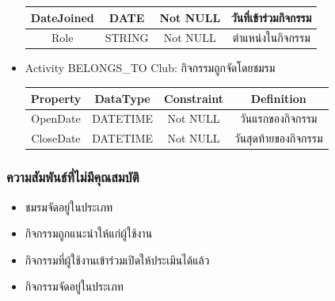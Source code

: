 \documentclass[14pt,oneside,openright,a4paper]{cpe-thai-project}
\begin{document}
\begin{itemize}
\begin{center}
\begin{tabular}{|c|c|c|c|}
          DateJoined & DATE     & Not NULL    & วันที่เข้าร่วมกิจกรรม \\ \hline
          Role       & STRING   & Not NULL    & ตำแหน่งในกิจกรรม \\ \hline
          \end{tabular}
          \label{tab:ActivityRelationship}
        \end{center}
      \item Activity BELONGS\_TO Club: กิจกรรมถูกจัดโดยชมรม
        \begin{center}
          \begin{tabular}{|c|c|c|c|}
          \hline
          \rowcolor[HTML]{9FC5E8} 
          Property   & DataType & Constraint & Definition \\ \hline
          OpenDate   & DATETIME & Not NULL    & วันแรกของกิจกรรม \\ \hline
          CloseDate  & DATETIME & Not NULL    & วันสุดท้ายของกิจกรรม \\ \hline
          \end{tabular}
          \label{tab:ClubActivityRelationship}
        \end{center}
    \end{itemize}    
      \subsubsection{ความสัมพันธ์ที่ไม่มีคุณสมบัติ}
        \normalsize
        \begin{itemize}
          \item ชมรมจัดอยู่ในประเภท
          \item กิจกรรมถูกแนะนำให้แก่ผู้ใช้งาน
          \item กิจกรรมที่ผู้ใช้งานเข้าร่วมเปิดให้ประเมินได้แล้ว
          \item กิจกรรมจัดอยู่ในประเภท
        \end{itemize}
\makeatletter
\g@addto@macro{\UrlBreaks}{\UrlOrds}
\makeatother



\end{document}
